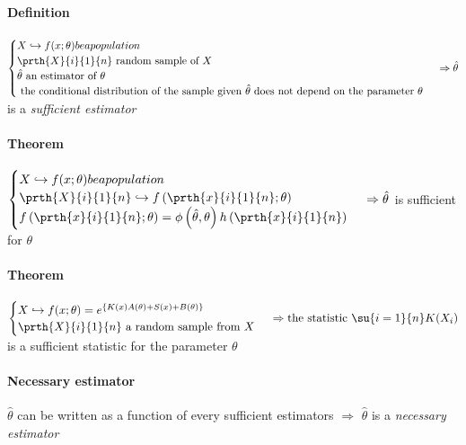 \paragraph{Definition}
$
\begin{cases}
	X\hookrightarrow f(x;\theta) be a population\\
	\prth{X}{i}{1}{n}\text{ random sample of }X\\
	\hat{\theta}\text{ an estimator of }\theta\\
	\text{ the conditional distribution of the sample given }\hat{\theta}\text{ does not depend on the parameter }\theta
\end{cases}\\
\Rightarrow
\hat{\theta}
$
is a \emph{sufficient estimator}

\paragraph{Theorem}
$
\begin{cases}
	X\hookrightarrow f(x;\theta) be a population\\
	\prth{X}{i}{1}{n}\hookrightarrow f\left(\prth{x}{i}{1}{n};\theta\right)\\
	f\left(\prth{x}{i}{1}{n};\theta\right)=\phi\left(\hat{\theta},\theta\right)h\left(\prth{x}{i}{1}{n}\right)\\
\end{cases}\\
\Rightarrow
\hat{\theta}
$
is sufficient for $\theta$

\paragraph{Theorem}
$
\begin{cases}
	X\hookrightarrow f(x;\theta)=e^{\left\{K(x)A(\theta)+S(x)+B(\theta)\right\}}\\
	\prth{X}{i}{1}{n}\text{ a random sample from }X
\end{cases}\\
\Rightarrow
\text{the statistic }\su{{i=1}}{n}K(X_{i})
$ is a sufficient statistic for the parameter $\theta$

\paragraph{Necessary estimator}
$\hat{\theta}$ can be written as a function of every sufficient
estimators $\Rightarrow$ $\hat{\theta}$ is a \emph{necessary estimator}
